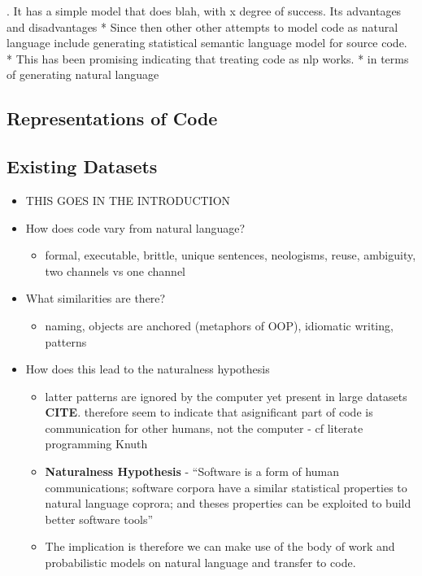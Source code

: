 . It has a simple model that does blah, with x degree of success. Its advantages and disadvantages
* Since then other other attempts to model code as natural language include generating statistical semantic language model for source code.
* This has been promising indicating that treating code as nlp works.
* in terms of generating natural language

\subsection{Representations of Code}

\subsection{Existing Datasets}


\begin{itemize}
    \item THIS GOES IN THE INTRODUCTION
    \item How does code vary from natural language?
        \begin{itemize}
            \item formal, executable, brittle, unique sentences, neologisms, reuse, ambiguity, two channels vs one channel
        \end{itemize}
    \item What similarities are there?
        \begin{itemize}
            \item naming, objects are anchored (metaphors of OOP), idiomatic writing, patterns
        \end{itemize}
    \item How does this lead to the naturalness hypothesis
        \begin{itemize}
            \item latter patterns are ignored by the computer yet present in large datasets \textbf{CITE}. 
            therefore seem to indicate that asignificant part of code is communication for other humans, not the computer - cf literate programming Knuth
            \item \textbf{Naturalness Hypothesis} - ``Software is a form of human communications; software corpora have a similar statistical properties to natural language coprora; and theses properties can be exploited to build better software tools'' 
            \item The implication is therefore we can make use of the body of work and probabilistic models on natural language and transfer to code.
        \end{itemize}
\end{itemize}


